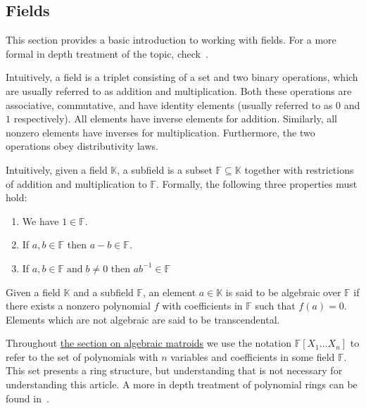 \subsection{Fields}\label{sec:appendix-fields}

This section provides a basic introduction to working with fields. For a more formal in depth treatment of the topic, check~\cite{milne2022}.

\begin{defn}[Fields]
  Intuitively, a field is a triplet consisting of a set and two binary operations, which are usually referred to as addition and multiplication. Both these operations are associative, commutative, and have identity elements (usually referred to as $0$ and $1$ respectively). All elements have inverse elements for addition. Similarly, all nonzero elements have inverses for multiplication. Furthermore, the two operations obey distributivity laws.
\end{defn}

\begin{defn}[Subfields]
  Intuitively, given a field $\mathbb{K}$, a subfield is a subset $\mathbb{F} \subseteq \mathbb{K}$ together with restrictions of addition and multiplication to $\mathbb{F}$. Formally, the following three properties must hold:
  \begin{enumerate}
    \item We have $1 \in \mathbb{F}$.
    \item If $a, b \in \mathbb{F} $ then $ a - b \in \mathbb{F}$.
    \item If $a, b \in \mathbb{F} \;\text{and}\; b \neq 0$ then $ a b ^{-1}  \in \mathbb{F}$
  \end{enumerate}
\end{defn}

\begin{defn}
  Given a field $\mathbb{K}$ and a subfield $\mathbb{F}$, an element $a \in \mathbb{K}$ is said to be algebraic over $\mathbb{F}$ if there exists a nonzero polynomial $f$ with coefficients in $\mathbb{F}$ such that $f(a) = 0$. Elements which are not algebraic are said to be transcendental.
\end{defn}


Throughout \hyperref[sec:algebraic-matroids]{the section on algebraic matroids} we use the notation $\mathbb{F}[X _1 \ldots X_n]$ to refer to the set of polynomials with $n$ variables and coefficients in some field $\mathbb{F}$. This set presents a ring structure, but understanding that is not necessary for understanding this article. A more in depth treatment of polynomial rings can be found in~\cite{milne2022}.



